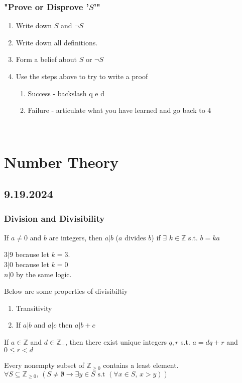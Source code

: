 \documentclass[11pt]{scrartcl}
\begin{document}
\subsubsection{"Prove or Disprove '$S$'"}
\begin{enumerate}
    \item Write down $S$ and $\neg S$
    \item Write down all definitions.
    \item Form a belief about $S$ or $\neg S$
    \item Use the steps above to try to write a proof \begin{enumerate}
        \item Success - backslash q e d
        \item Failure - articulate what you have learned and go back to $4$
    \end{enumerate}
\end{enumerate}
\noindent
\Line
\\
\section{Number Theory}
\subsection{9.19.2024}
\subsubsection{Division and Divisibility}
\begin{definition}[Divisibility]
    If $a \neq 0$ and $b$ are integers, then $a | b$ ($a$ divides $b$) if $\exists$ $k \in \mathbb{Z}$ s.t. $b=ka$
\end{definition}
\begin{example}
    $3|9$ because let $k=3$.  \\
    $3|0$ because let $k=0$\\
    $n|0$ by the same logic.
\end{example}
\begin{proposition}
        Below are some properties of divisibiltiy\begin{enumerate}
        \item Transitivity
        \item If $a|b$ and $a|c$ then $a|b+c$
    \end{enumerate}
\end{proposition}
\begin{theorem}
    If $a \in \mathbb{Z}$ and $d \in \mathbb{Z}_+$, then there exist unique integers $q, r$ s.t. $a=dq + r$ and $0 \leq r < d$
\end{theorem}
\begin{axiom}
    Every nonempty subset of $\mathbb{Z}_{\geq0}$ contains a least element.\\
    $\forall S \subseteq \mathbb{Z}_{\geq 0}\text{, } (S \neq \emptyset \rightarrow \exists y \in S\text{ s.t }( \forall x \in S \text{, } x > y))$
\end{axiom}
\end{document}
